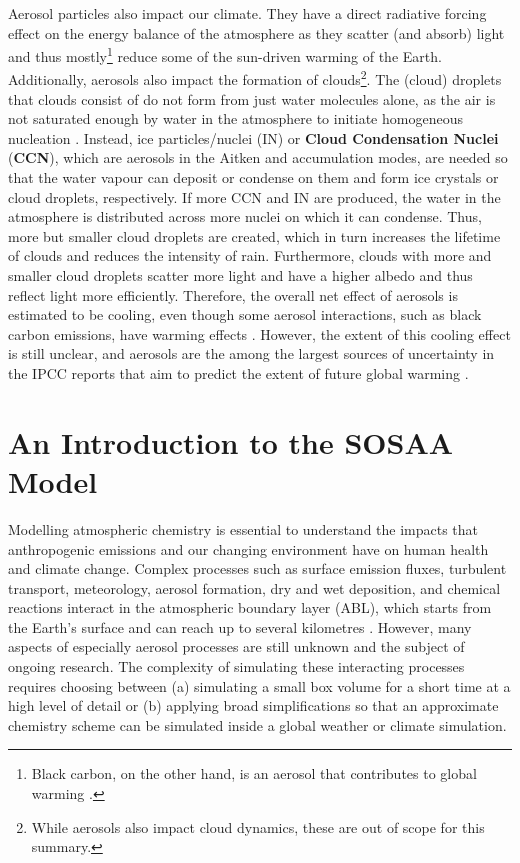 \noindent Aerosol particles also impact our climate. They have a direct radiative forcing effect on the energy balance of the atmosphere as they scatter (and absorb) light and thus mostly\footnote{Black carbon, on the other hand, is an aerosol that contributes to global warming \cite{ipcc-6-summary-2021}.} reduce some of the sun-driven warming of the Earth. Additionally, aerosols also impact the formation of clouds\footnote{While aerosols also impact cloud dynamics, these are out of scope for this summary.}. The (cloud) droplets that clouds consist of do not form from just water molecules alone, as the air is not saturated enough by water in the atmosphere to initiate homogeneous nucleation \cite{ccn-1999}. Instead, ice particles/nuclei (IN) or \textbf{Cloud Condensation Nuclei} (\textbf{CCN}), which are aerosols in the Aitken and accumulation modes, are needed so that the water vapour can deposit or condense on them and form ice crystals or cloud droplets, respectively. If more CCN and IN are produced, the water in the atmosphere is distributed across more nuclei on which it can condense. Thus, more but smaller cloud droplets are created, which in turn increases the lifetime of clouds and reduces the intensity of rain. Furthermore, clouds with more and smaller cloud droplets scatter more light and have a higher albedo and thus reflect light more efficiently. Therefore, the overall net effect of aerosols is estimated to be cooling, even though some aerosol interactions, such as black carbon emissions, have warming effects \cite{ipcc-6-summary-2021}. However, the extent of this cooling effect is still unclear, and aerosols are the among the largest sources of uncertainty in the IPCC reports that aim to predict the extent of future global warming \cite{ipcc-6-summary-2021}.

\section{An Introduction to the SOSAA Model} \label{txt:sosaa-model}

Modelling atmospheric chemistry is essential to understand the impacts that anthropogenic emissions and our changing environment have on human health and climate change. Complex processes such as surface emission fluxes, turbulent transport, meteorology, aerosol formation, dry and wet deposition, and chemical reactions interact in the atmospheric boundary layer (ABL), which starts from the Earth's surface and can reach up to several kilometres \cite{sosa-description-2011}. However, many aspects of especially aerosol processes are still unknown and the subject of ongoing research. The complexity of simulating these interacting processes requires choosing between (a) simulating a small box volume for a short time at a high level of detail or (b) applying broad simplifications so that an approximate chemistry scheme can be simulated inside a global weather or climate simulation.

